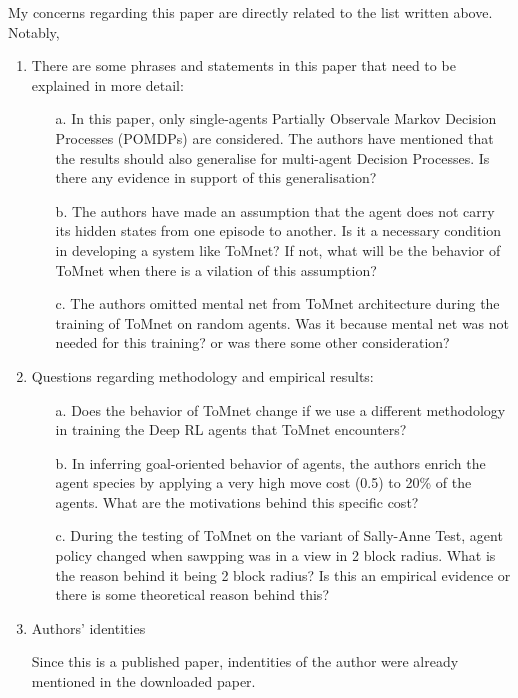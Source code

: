 \documentclass{article}
\begin{document}
\noindent
My concerns regarding this paper are directly related to the list written above.\\
Notably,
\begin{enumerate}
\item There are some phrases and statements in this paper that need to be explained in more detail:
\begin{itemize}
\item[{a.}] In this paper, only single-agents Partially Observale Markov Decision Processes (POMDPs) are considered. The authors have mentioned that the results should also generalise for multi-agent Decision Processes. Is there any evidence in support of this generalisation?
\item[{b.}] The authors have made an assumption that the agent does not carry its hidden states from one episode to another. Is it a necessary condition in developing a system like ToMnet? If not, what will be the behavior of ToMnet when there is a vilation of this assumption?
\item[{c.}] The authors omitted mental net from ToMnet architecture during the training of ToMnet on random agents. Was it because mental net was not needed for this training? or was there some other consideration?

\end{itemize}

\item Questions regarding methodology and empirical results:
\begin{itemize}
\item[{a.}] Does the behavior of ToMnet change if we use a different methodology in training the Deep RL agents that ToMnet encounters?
\item[{b.}] In inferring goal-oriented behavior of agents, the authors enrich the agent species by applying a very
high move cost (0.5) to 20\% of the agents. What are the motivations behind this specific cost?

\item[{c.}] During the testing of ToMnet on the variant of Sally-Anne Test, agent policy changed when sawpping was in a view in 2 block radius. What is the reason behind it being 2 block radius? Is this an empirical evidence or there is some theoretical reason behind this?
\end{itemize}

\item Authors' identities

Since this is a published paper, indentities of the author were already mentioned in the downloaded paper.

\end{enumerate}




\end{document}
